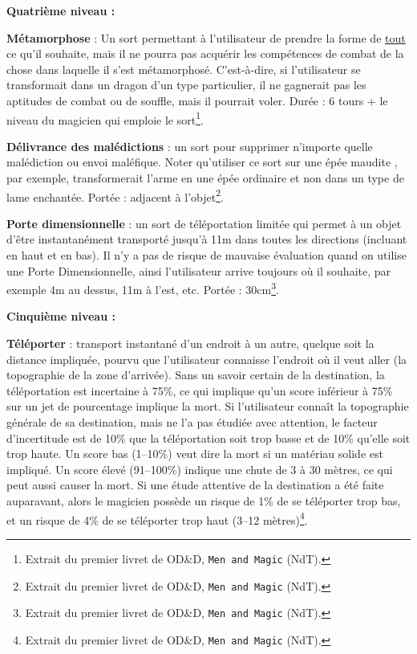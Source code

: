 \documentclass[11pt]{article}
\begin{document}
{\bigskip

\textbf{Quatrième niveau :}

\bigskip

\textbf{Métamorphose} : Un sort permettant à l'utilisateur de prendre la forme de \underline{tout} ce qu'il souhaite, mais il ne pourra pas acquérir les compétences de combat de la chose dans laquelle il s'est métamorphosé. C'est-à-dire, si l'utilisateur se transformait dans un dragon d'un type particulier, il ne gagnerait pas les aptitudes de combat ou de souffle, mais il pourrait voler. Durée : 6 tours + le niveau du magicien qui emploie le sort\footnote{Extrait du premier livret de OD\&D, \texttt{Men and Magic} (NdT).}.

\bigskip

\textbf{Délivrance des malédictions} : un sort pour supprimer n'importe quelle malédiction ou envoi maléfique. Noter qu'utiliser ce sort sur une \og épée maudite \fg{}, par exemple, transformerait l'arme en une épée ordinaire et non dans un type de lame enchantée. Portée : adjacent à l'objet\footnote{Extrait du premier livret de OD\&D, \texttt{Men and Magic} (NdT).}.

\bigskip

\textbf{Porte dimensionnelle} : un sort de téléportation limitée qui permet à un objet d'être instantanément transporté jusqu'à 11m dans toutes les directions (incluant en haut et en bas). Il n'y a pas de risque de mauvaise évaluation quand on utilise une Porte Dimensionnelle, ainsi l'utilisateur arrive toujours où il souhaite, par exemple 4m au dessus, 11m à l'est, etc. Portée : 30cm\footnote{Extrait du premier livret de OD\&D, \texttt{Men and Magic} (NdT).}.

\bigskip

\textbf{Cinquième niveau :}

\bigskip

\textbf{Téléporter} : transport instantané d'un endroit à un autre, quelque soit la distance impliquée, pourvu que l'utilisateur connaisse l'endroit où il veut aller (la topographie de la zone d'arrivée). Sans un savoir certain de la destination, la téléportation est incertaine à 75\%, ce qui implique qu'un score inférieur à 75\% sur un jet de pourcentage implique la mort. Si l'utilisateur connaît la topographie générale de sa destination, mais ne l'a pas étudiée avec attention, le facteur d'incertitude est de 10\% que la téléportation soit trop basse et de 10\% qu'elle soit trop haute. Un score bas (1--10\%) veut dire la mort si un matériau solide est impliqué. Un score élevé (91--100\%) indique une chute de 3 à 30 mètres, ce qui peut aussi causer la mort. Si une étude attentive de la destination a été faite auparavant, alors le magicien possède un risque de 1\% de se téléporter trop bas, et un risque de 4\% de se téléporter trop haut (3--12 mètres)\footnote{Extrait du premier livret de OD\&D, \texttt{Men and Magic} (NdT).}.

}
\end{document}
